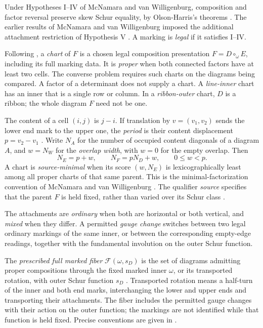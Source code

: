 \documentclass[11pt,a4paper]{amsart}
\numberwithin{equation}{section}
\theoremstyle{plain}
\theoremstyle{definition}
\begin{document}
Under Hypotheses I--IV of McNamara and van Willigenburg, composition
and factor reversal preserve skew Schur equality, by Olson-Harris's
theorems \cite{OlsonHarris2024HopfApplications}.  The earlier results of
McNamara and van Willigenburg imposed the additional attachment restriction
of Hypothesis V \cite{McNamara2009Classification}.
A marking is \emph{legal} if it satisfies I--IV.

Following \cite{Shields2026Gluing}, a \emph{chart} of \(F\) is a chosen
legal composition presentation \(F=D\circ_\omega E\), including its full
marking data.  It is \emph{proper} when both connected factors have at
least two cells.  The converse problem requires such charts on the
diagrams being compared.  A factor of a determinant does not supply a chart.
A \emph{line-inner} chart has an inner that is a single row or column.
In a \emph{ribbon-outer} chart, \(D\) is a ribbon; the whole diagram
\(F\) need not be one.

The content of a cell \((i,j)\) is \(j-i\).  If translation by
\(v=(v_1,v_2)\) sends the lower end mark to the upper one, the
\emph{period} is their content displacement \(p=v_2-v_1\)
\cite{Shields2026Gluing}.  Write \(N_A\) for the number of occupied
content diagonals of a diagram \(A\), and \(w=N_W\) for the
\emph{overlap width}, with \(w=0\) for the empty overlap.  Then
\begin{equation}\label{eq:intro-span}
 N_E=p+w,\qquad N_F=pN_D+w,\qquad 0\le w<p.
\end{equation}
A chart is \emph{source-minimal} when its score \((w,N_E)\) is lexicographically
least among all proper charts of that same parent.  This is the
minimal-factorization convention of McNamara and van Willigenburg
\cite{McNamara2009Classification}.  The qualifier \emph{source} specifies
that the parent \(F\) is held fixed, rather than varied over its Schur
class \cite{Shields2026Gluing}.

The attachments are \emph{ordinary} when both are horizontal or both
vertical, and \emph{mixed} when they differ.  A permitted \emph{gauge
change} switches between two legal ordinary markings of the same inner,
or between the corresponding empty-edge readings, together with the
fundamental involution on the outer Schur function.

The \emph{prescribed full marked fiber} \(\mathcal F(\omega,s_D)\) is
the set of diagrams admitting proper compositions through the fixed
marked inner \(\omega\), or its transported rotation, with outer Schur
function \(s_D\) \cite{Shields2026Gluing}.  Transported rotation means
a half-turn of the inner and both end marks, interchanging the lower
and upper ends and transporting their attachments.  The fiber includes
the permitted gauge changes with their action on the outer function;
the markings are not identified while that function is held fixed.
Precise conventions are given in .
\end{document}

